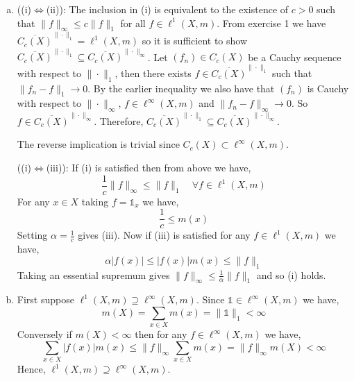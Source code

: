 \begin{enumerate}[(a)]
	\item 
		((i)$\iff$(ii)): The inclusion in (i) is equivalent to the existence of $c>0$ such that $\|f\|_{\infty}\leq c\|f\|_{1}$ for all $f\in\ell^{1}(X,m)$. From exercise 1 we have $\overline{C_{c}(X)}^{\|\cdot\|_{1}}=\ell^{1}(X,m)$ so it is sufficient to show $\overline{C_{c}(X)}^{\|\cdot\|_{1}}\subseteq \overline{C_{c}(X)}^{\|\cdot\|_{\infty}}$. Let $(f_{n})\in C_{c}(X)$ be a Cauchy sequence with respect to $\|\cdot\|_{1}$, then there exists $f\in\overline{C_{c}(X)}^{\|\cdot\|_{1}}$ such that $\|f_{n}-f\|_{1}\to 0$. By the earlier inequality we also have that $(f_{n})$ is Cauchy with respect to $\|\cdot\|_{\infty}$, $f\in\ell^{\infty}(X,m)$ and $\|f_{n}-f\|_{\infty}\to 0$. So $f\in\overline{C_{c}(X)}^{\|\cdot\|_{\infty}}$. Therefore, $\overline{C_{c}(X)}^{\|\cdot\|_{1}}\subseteq\overline{C_{c}(X)}^{\|\cdot\|_{\infty}}$.

		The reverse implication is trivial since $C_{c}(X)\subset\ell^{\infty}(X,m)$.

		((i)$\iff$(iii)): If (i) is satisfied then from above we have,
		\begin{equation*}
			\frac{1}{c}\|f\|_{\infty}\leq \|f\|_{1} \quad \forall f\in\ell^{1}(X,m)
		\end{equation*}
		For any $x\in X$ taking $f=\mathds{1}_{x}$ we have,
		\begin{equation*}
			\frac{1}{c}\leq m(x)
		\end{equation*}
		Setting $\alpha=\frac{1}{c}$ gives (iii). Now if (iii) is satisfied for any $f\in\ell^{1}(X,m)$ we have,
		\begin{equation*}
			\alpha |f(x)| \leq |f(x)|m(x) \leq \|f\|_{1}
		\end{equation*}
		Taking an essential supremum gives $\|f\|_{\infty}\leq\frac{1}{\alpha}\|f\|_{1}$ and so (i) holds.
	\item 
		First suppose $\ell^{1}(X,m)\supseteq\ell^{\infty}(X,m)$. Since $\mathds{1}\in\ell^{\infty}(X,m)$ we have,
		\begin{equation*}
			m(X)=\sum_{x\in X}m(x) = \|\mathds{1}\|_{1} < \infty
		\end{equation*}
		Conversely if $m(X)<\infty$ then for any $f\in\ell^{\infty}(X,m)$ we have,
		\begin{equation*}
			\sum_{x\in X}|f(x)|m(x) \leq \|f\|_{\infty}\sum_{x\in X}m(x) = \|f\|_{\infty}m(X) < \infty
		\end{equation*}
		Hence, $\ell^{1}(X,m)\supseteq\ell^{\infty}(X,m)$.
\end{enumerate}

